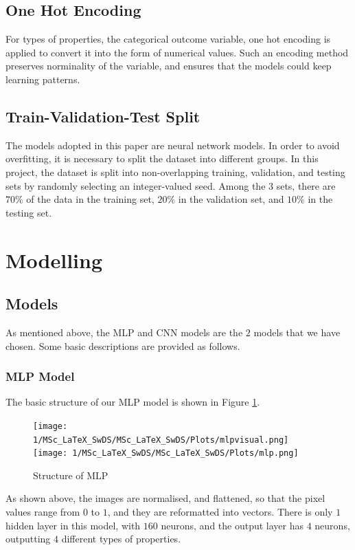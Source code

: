 \documentclass[11pt,twoside]{article}
\numberwithin{Theorem}{section}
\numberwithin{Definition}{section}
\numberwithin{Lemma}{section}
\numberwithin{Algorithm}{section}
\numberwithin{equation}{section}
\begin{document}
\subsection{One Hot Encoding}
For types of properties, the categorical outcome variable, one hot encoding is applied to convert it into the form of numerical values. Such an encoding method preserves norminality of the variable, and ensures that the models could keep learning patterns.

\subsection{Train-Validation-Test Split}
The models adopted in this paper are neural network models. In order to avoid overfitting, it is necessary to split the dataset into different groups. In this project, the dataset is split into non-overlapping training, validation, and testing sets by randomly selecting an integer-valued seed. Among the $3$ sets, there are $70\%$ of the data in the training set, $20\%$ in the validation set, and $10\%$ in the testing set.

\section{Modelling}

\subsection{Models}
As mentioned above, the MLP and CNN models are the $2$ models that we have chosen. Some basic descriptions are provided as follows.

\subsubsection{MLP Model}
The basic structure of our MLP model is shown in Figure \ref{fig:mlp}.

\begin{figure}[h]
\centering
\texttt{[image: 1/MSc\_LaTeX\_SwDS/MSc\_LaTeX\_SwDS/Plots/mlpvisual.png]}
\texttt{[image: 1/MSc\_LaTeX\_SwDS/MSc\_LaTeX\_SwDS/Plots/mlp.png]}
\caption{Structure of MLP}
\label{fig:mlp}
\end{figure}

As shown above, the images are normalised, and flattened, so that the pixel values range from $0$ to $1$, and they are reformatted into vectors. There is only $1$ hidden layer in this model, with $160$ neurons, and the output layer has $4$ neurons, outputting $4$ different types of properties.
\end{document}
